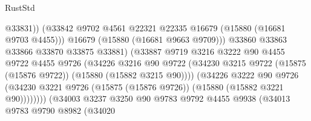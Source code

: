 \begin{lexlean}{RustStd}
\begin{coremodule}
                                            @33831))
                                        (@33842
                                          @9702
                                          @4561
                                          @22321
                                          @22335
                                          @16679
                                          (@15880 (@16681 @9703 @4455)))
                                        @16679
                                        (@15880 (@16681 @9663 @9709)))
                                      @33860
                                      @33863
                                      @33866
                                      @33870
                                      @33875
                                      @33881)
                                    (@33887
                                      @9719
                                      @3216
                                      @3222
                                      @90
                                      @4455
                                      @9722
                                      @4455
                                      @9726
                                      (@34226
                                        @3216
                                        @90
                                        @9722
                                        (@34230
                                          @3215
                                          @9722
                                          (@15875 (@15876 @9722))
                                          (@15880 (@15882 @3215 @90))))
                                      (@34226
                                        @3222
                                        @90
                                        @9726
                                        (@34230
                                          @3221
                                          @9726
                                          (@15875 (@15876 @9726))
                                          (@15880 (@15882 @3221 @90))))))))
                              (@34003
                                @3237
                                @3250
                                @90
                                @9783
                                @9792
                                @4455
                                @9938
                                (@34013
                                  @9783
                                  @9790
                                  @8982
                                  (@34020

\end{coremodule}
\end{lexlean}
